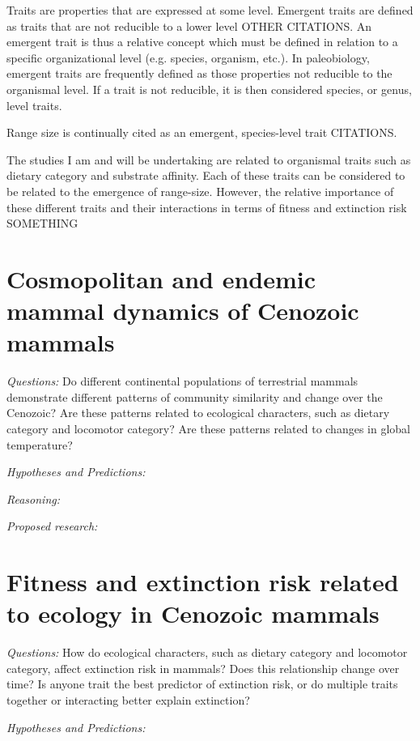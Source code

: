 \documentclass[12pt,letterpaper]{article}
\begin{document}
Traits are properties that are expressed at some level. Emergent traits are defined as traits that are not reducible to a lower level \citep{Jablonski2008a}OTHER CITATIONS. An emergent trait is thus a relative concept which must be defined in relation to a specific organizational level (e.g. species, organism, etc.). In paleobiology, emergent traits are frequently defined as those properties not reducible to the organismal level. If a trait is not reducible, it is then considered species, or genus, level traits.

Range size is continually cited as an emergent, species-level trait CITATIONS. 

The studies I am and will be undertaking are related to organismal traits such as dietary category and substrate affinity. Each of these traits can be considered to be related to the emergence of range-size. However, the relative importance of these different traits and their interactions in terms of fitness and extinction risk SOMETHING


\section{Cosmopolitan and endemic mammal dynamics of Cenozoic mammals}

\textit{Questions:} Do different continental populations of terrestrial mammals demonstrate different patterns of community similarity and change over the Cenozoic? Are these patterns related to ecological characters, such as dietary category and locomotor category? Are these patterns related to changes in global temperature?

\textit{Hypotheses and Predictions:}

\textit{Reasoning:}

\textit{Proposed research:}


\section{Fitness and extinction risk related to ecology in Cenozoic mammals}

\textit{Questions:} How do ecological characters, such as dietary category and locomotor category, affect extinction risk in mammals? Does this relationship change over time? Is anyone trait the best predictor of extinction risk, or do multiple traits together or interacting better explain extinction?

\textit{Hypotheses and Predictions:}
\end{document}
